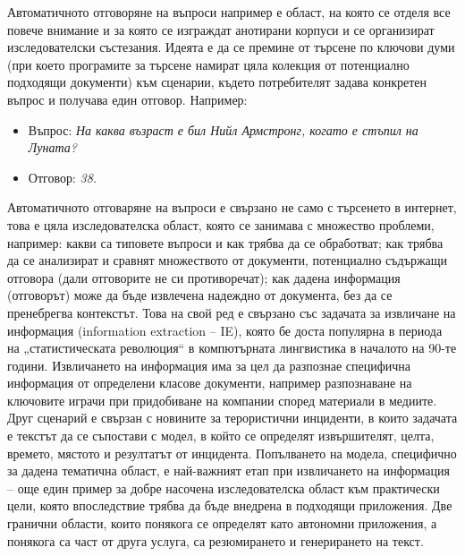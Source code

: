 \documentclass[]{../../metanetpaper}
\begin{document}
\begin{multicols}{2}
Автоматичното отговоряне на въпроси например е област, на която се отделя все повече внимание и за която се изграждат анотирани корпуси и се организират изследователски състезания. Идеята е да се премине от търсене по ключови думи (при което програмите за търсене намират цяла колекция от потенциално
 подходящи документи) към сценарии, където потребителят задава конкретен въпрос и получава един отговор. Например: 

\columnbreak
\begin{itemize}
\item[] Въпрос: \textit{На каква възраст е бил Нийл Армстронг, когато е стъпил на Луната?}
\item[] Отговор: \textit{38.}
\end{itemize}

Автоматичното отговаряне на въпроси е свързано не само с търсенето в интернет, това е цяла изследователска област, която се занимава с множество проблеми, например: какви са типовете въпроси и как трябва да се обработват; как трябва да се анализират и сравнят множеството от документи, потенциално
 съдържащи отговора (дали отговорите не си противоречат); как
дадена информация (отговорът) може да бъде извлечена  надеждно от документа, без да се пренебрегва контекстът.
Това на свой ред е свързано със задачата за извличане на информация (information extraction -- IE), която бе доста популярна в периода на „статистическата революция“ в компютърната лингвистика в началото на 90-те години. Извличането на информация има за цел да разпознае специфична информация от определени класове документи, например разпознаване на ключовите играчи при
 придобиване на компании според материали в медиите. Друг сценарий е свързан с новините за терористични инциденти, в които задачата е текстът да се съпостави  с модел, в който се определят извършителят, целта, времето, мястото и резултатът от инцидента. Попълването на модела, специфично за дадена тематична област, е най-важният етап при извличането на информация – още
 един пример за добре насочена изследователска област към практически цели, която впоследствие трябва да бъде внедрена в подходящи приложения.
%
Две гранични области, които понякога се определят като автономни приложения, а понякога са част от друга услуга, са резюмирането и генерирането на текст. 



\end{multicols}
\end{document}
